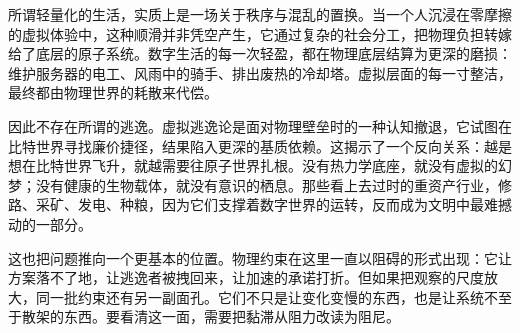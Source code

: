 所谓轻量化的生活，实质上是一场关于秩序与混乱的置换。当一个人沉浸在零摩擦的虚拟体验中，这种顺滑并非凭空产生，它通过复杂的社会分工，把物理负担转嫁给了底层的原子系统。数字生活的每一次轻盈，都在物理底层结算为更深的磨损：维护服务器的电工、风雨中的骑手、排出废热的冷却塔。虚拟层面的每一寸整洁，最终都由物理世界的耗散来代偿。

因此不存在所谓的逃逸。虚拟逃逸论是面对物理壁垒时的一种认知撤退，它试图在比特世界寻找廉价捷径，结果陷入更深的基质依赖。这揭示了一个反向关系：越是想在比特世界飞升，就越需要往原子世界扎根。没有热力学底座，就没有虚拟的幻梦；没有健康的生物载体，就没有意识的栖息。那些看上去过时的重资产行业，修路、采矿、发电、种粮，因为它们支撑着数字世界的运转，反而成为文明中最难撼动的一部分。

这也把问题推向一个更基本的位置。物理约束在这里一直以阻碍的形式出现：它让方案落不了地，让逃逸者被拽回来，让加速的承诺打折。但如果把观察的尺度放大，同一批约束还有另一副面孔。它们不只是让变化变慢的东西，也是让系统不至于散架的东西。要看清这一面，需要把黏滞从阻力改读为阻尼。

